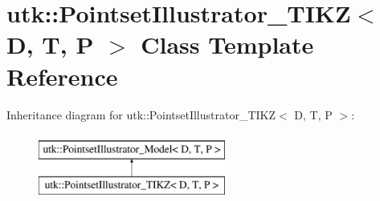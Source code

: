 \hypertarget{classutk_1_1PointsetIllustrator__TIKZ}{\section{utk\-:\-:Pointset\-Illustrator\-\_\-\-T\-I\-K\-Z$<$ D, T, P $>$ Class Template Reference}
\label{classutk_1_1PointsetIllustrator__TIKZ}
}
Inheritance diagram for utk\-:\-:Pointset\-Illustrator\-\_\-\-T\-I\-K\-Z$<$ D, T, P $>$\-:\begin{figure}[H]
\begin{center}
\leavevmode
\includegraphics[height=2.000000cm]{classutk_1_1PointsetIllustrator__TIKZ}
\end{center}
\end{figure}

